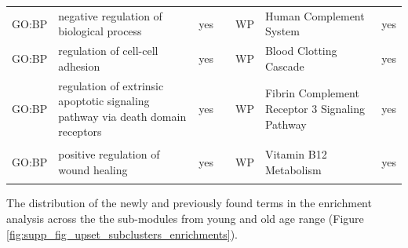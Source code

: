 \begin{longtable}{@{}lp{5cm}lllp{5cm}l@{}}
GO:BP           & negative regulation of biological process                                                                                          & yes              &           & WP              & Human Complement System                                                                                                                                                & yes              \\
GO:BP           & regulation of cell-cell adhesion                                                                                                   & yes              &           & WP              & Blood Clotting Cascade                                                                                                                                                 & yes              \\
GO:BP           & regulation of extrinsic apoptotic signaling pathway via death domain receptors          & yes              &           & WP              & Fibrin Complement Receptor 3 Signaling Pathway                                                                                                                         & yes              \\
GO:BP           & positive regulation of wound healing                                                                                               & yes              &           & WP              & Vitamin B12 Metabolism                                                                                                                                                 & yes             

\label{supp:table_c6_enrich}
\end{longtable}


The distribution of the newly and previously found terms in the enrichment analysis across the the sub-modules from young and old age range (Figure \ref{fig:supp_fig_upset_subclusters_enrichments}).

